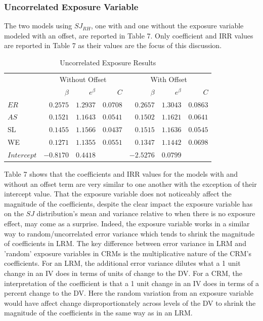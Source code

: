 \documentclass[ShortAfour,times,sageapa]{sagej}
\begin{document}
		\subsubsection{Uncorrelated Exposure Variable}
		
	The two models using $SJ_{RH}$, one with and one without the exposure variable modeled with an offset, are reported in Table 7.
	Only coefficient and IRR values are reported in Table 7 as their values are the focus of this discussion.
		
	\begin{table}[h!]
		\centering
		\caption{\centering Uncorrelated Exposure Results}
		\begin{tabular}{l|rrrrrr}
			\toprule
			\multicolumn{1}{l}{} & \multicolumn{3}{c}{Without Offset} & \multicolumn{3}{c}{With Offset} \\ 
			\cmidrule(lr){2-4} \cmidrule(lr){5-7}
			\multicolumn{1}{l}{} & $\beta$ & $e^{\beta}$ & $C$ & $\beta$ & $e^{\beta}$ & $C$ \\ 
			\midrule
			$ER$ & $0.2575$ & $1.2937$ & $0.0708$ & $0.2657$ & $1.3043$ & $0.0863$ \\ 
			$AS$ & $0.1521$ & $1.1643$ & $0.0541$ & $0.1502$ & $1.1621$ & $0.0641$ \\ 
			SL & $0.1455$ & $1.1566$ & $0.0437$ & $0.1515$ & $1.1636$ & $0.0545$ \\ 
			WE & $0.1271$ & $1.1355$ & $0.0551$ & $0.1347$ & $1.1442$ & $0.0698$ \\ 
			$Intercept$ & $-0.8170$ & $0.4418$ & & $-2.5276$ & $0.0799$ & \\ 
			\bottomrule
		\end{tabular}
	\label{tab:unexp}
	\end{table}
	
	Table 7 shows that the coefficients and IRR values for the models with and without an offset term are very similar to one another with the exception of their intercept value.
	That the exposure variable does not noticeably affect the magnitude of the coefficients, despite the clear impact the exposure variable has on the $SJ$ distribution's mean and variance relative to when there is no exposure effect, may come as a surprise.
	Indeed, the exposure variable works in a similar way to random/uncorrelated error variance which tends to shrink the magnitude of coefficients in LRM.
	The key difference between error variance in LRM and 'random' exposure variables in CRMs is the multiplicative nature of the CRM's coefficients.
	For an LRM, the additional error variance dilutes what a 1 unit change in an IV does in terms of units of change to the DV.
	For a CRM, the interpretation of the coefficient is that a 1 unit change in an IV does in terms of a percent change to the DV.
	Here the random variation from an exposure variable would have affect change disproportionately across levels of the DV to shrink the magnitude of the coefficients in the same way as in an LRM.
	
\end{document}
